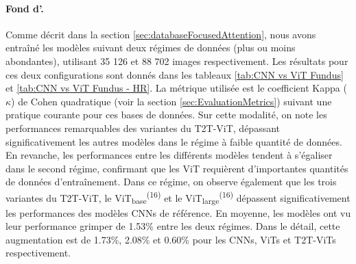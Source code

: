 \paragraph{Fond d'\oeil.} Comme décrit dans la section \ref{sec:databaseFocusedAttention}, nous avons entraîné les modèles suivant deux régimes de données (plus ou moins abondantes), utilisant 35 126 et 88 702 images respectivement. Les résultats pour ces deux configurations sont donnés dans les tableaux \ref{tab:CNN vs ViT Fundus} et \ref{tab:CNN vs ViT Fundus - HR}. La métrique utilisée est le coefficient Kappa ($\kappa$) de Cohen quadratique (voir la section \ref{sec:EvaluationMetrics}) suivant une pratique courante pour ces bases de données. Sur cette modalité, on note les performances remarquables des variantes du T2T-ViT, dépassant significativement les autres modèles dans le régime à faible quantité de données. En revanche, les performances entre les différents modèles tendent à s'égaliser dans le second régime, confirmant que les ViT requièrent d'importantes quantités de données d'entraînement. Dans ce régime, on observe également que les trois variantes du T2T-ViT, le ViT\textsubscript{base}\textsuperscript{(16)} et le ViT\textsubscript{large}\textsuperscript{(16)} dépassent significativement les performances des modèles CNNs de référence. En moyenne, les modèles ont vu leur performance grimper de 1.53\% entre les deux régimes. Dans le détail, cette augmentation est de 1.73\%, 2.08\% et 0.60\% pour les CNNs, ViTs et T2T-ViTs respectivement.

